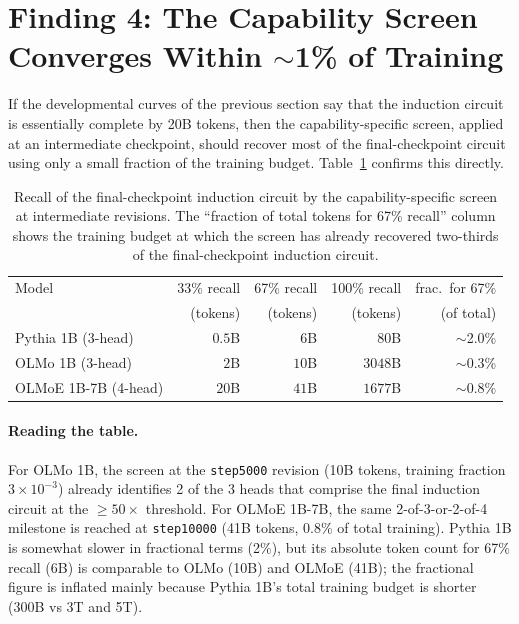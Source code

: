 \documentclass[11pt]{article}
\begin{document}
\section[Finding 4: The Capability Screen Converges Within \texorpdfstring{$\sim$1\%}{1\%} of Training]{Finding 4: The Capability Screen Converges Within $\sim$1\% of Training}
\label{sec:f4}

If the developmental curves of the previous section say that the
induction circuit is essentially complete by 20B tokens, then the
capability-specific screen, applied at an intermediate checkpoint, should
recover most of the final-checkpoint circuit using only a small fraction of
the training budget. Table~\ref{tab:convergence} confirms this directly.

\begin{table}[t]
\centering
\caption{Recall of the final-checkpoint induction circuit by the
capability-specific screen at intermediate revisions. The
``fraction of total tokens for 67\% recall'' column shows the training
budget at which the screen has already recovered two-thirds of the
final-checkpoint induction circuit.}
\label{tab:convergence}
\small
\begin{tabular}{l r r r r}
\toprule
Model & 33\% recall & 67\% recall & 100\% recall & frac.\ for 67\% \\
      & (tokens)    & (tokens)    & (tokens)     & (of total) \\
\midrule
Pythia 1B (3-head)    & $0.5$B & $6$B  & $80$B   & $\sim$2.0\% \\
OLMo 1B (3-head)      & $2$B   & $10$B & $3048$B & $\sim$0.3\% \\
OLMoE 1B-7B (4-head)  & $20$B  & $41$B & $1677$B & $\sim$0.8\% \\
\bottomrule
\end{tabular}
\end{table}

\paragraph{Reading the table.} For OLMo 1B, the screen at the
\texttt{step5000} revision (10B tokens, training fraction $3\times10^{-3}$)
already identifies 2 of the 3 heads that comprise the final induction
circuit at the $\ge\!50\times$ threshold. For OLMoE 1B-7B, the same
2-of-3-or-2-of-4 milestone is reached at \texttt{step10000} (41B tokens,
0.8\% of total training). Pythia 1B is somewhat slower in fractional
terms (2\%), but its absolute token count for 67\% recall (6B) is
comparable to OLMo (10B) and OLMoE (41B); the fractional figure is
inflated mainly because Pythia 1B's total training budget is shorter
(300B vs 3T and 5T).
\end{document}
